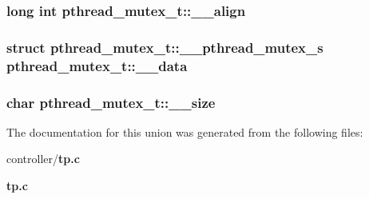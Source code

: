 \subsubsection[{\_\-\_\-align}]{\setlength{\rightskip}{0pt plus 5cm}long int {\bf pthread\_\-mutex\_\-t::\_\-\_\-align}}\label{unionpthread__mutex__t_a89926597f356f5f994bb7a62b0e26470}
\subsubsection[{\_\-\_\-data}]{\setlength{\rightskip}{0pt plus 5cm}struct {\bf pthread\_\-mutex\_\-t::\_\-\_\-pthread\_\-mutex\_\-s} {\bf pthread\_\-mutex\_\-t::\_\-\_\-data}}\label{unionpthread__mutex__t_aac7cef5b84c81089d5907f25ece33c3f}
\subsubsection[{\_\-\_\-size}]{\setlength{\rightskip}{0pt plus 5cm}char {\bf pthread\_\-mutex\_\-t::\_\-\_\-size}}\label{unionpthread__mutex__t_ae61f14d5317b49e798e5a478d23892ee}


The documentation for this union was generated from the following files:\begin{DoxyCompactItemize}
\item 
controller/{\bf tp.c}\item 
{\bf tp.c}\end{DoxyCompactItemize}
